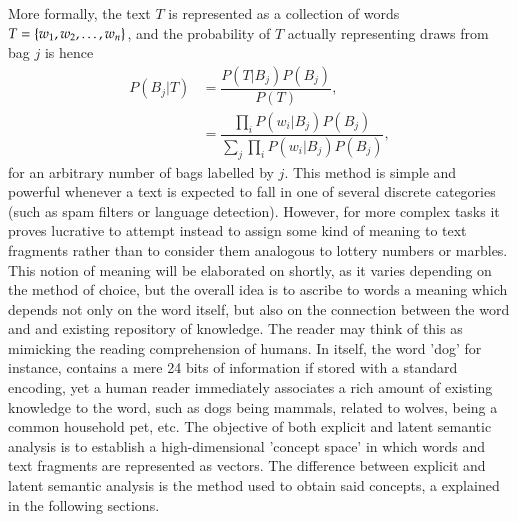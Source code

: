 More formally, the text $T$ is represented as a collection of words $T = \left\{ w_1, w_2, \ldots, w_n \right\}$, and the probability of  $T$ actually representing draws from bag $j$ is hence
\begin{align}
	P(B_j|T) &= \dfrac{P(T|B_j)P(B_j)}{P(T)}, \\
	&= \dfrac{\prod_i P(w_i|B_j)P(B_j)}{\sum_j\prod_i P(w_i|B_j)P(B_j)},
\end{align}
for an arbitrary number of bags labelled by $j$. This method is simple and powerful whenever a text is expected to fall in one of several discrete categories (such as spam filters or language detection). However, for more complex tasks it proves lucrative to attempt instead to assign some kind of meaning to text fragments rather than to consider them analogous to lottery numbers or marbles. This notion of meaning will be elaborated on shortly, as it varies depending on the method of choice, but the overall idea is to ascribe to words a meaning which depends not only on the word itself, but also on the connection between the word and and existing repository of knowledge. The reader may think of this as mimicking the reading comprehension of humans. In itself, the word 'dog' for instance, contains a mere 24 bits of information if stored with a standard encoding, yet a human reader immediately associates a rich amount of existing knowledge to the word, such as dogs being mammals, related to wolves, being a common household pet, etc. The objective of both explicit and latent semantic analysis is to establish a high-dimensional 'concept space' in which words and text fragments are represented as vectors. The difference between explicit and latent semantic analysis is the method used to obtain said concepts, a explained in the following sections.

